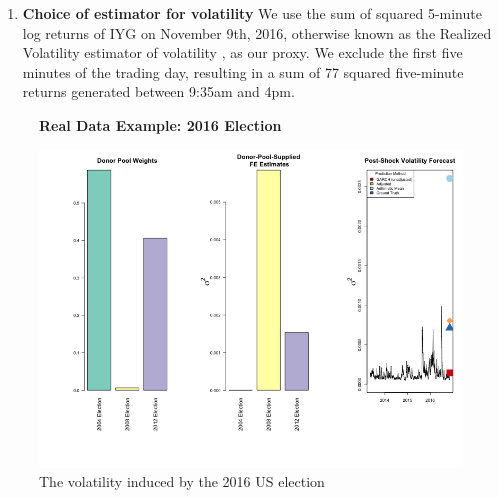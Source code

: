 \documentclass[11pt,3p,review,authoryear]{elsarticle}
\theoremstyle{definition}
\begin{document}
\begin{enumerate}
    \item \textbf{Choice of estimator for volatility} We use the sum of squared 5-minute log returns of IYG on November 9th, 2016, otherwise known as the Realized Volatility estimator of volatility \citep{andersen2008realized}, as our proxy.  We exclude the first five minutes of the trading day, resulting in a sum of 77 squared five-minute returns generated between 9:35am and 4pm.
\end{enumerate} 

\begin{figure}[H]
\begin{center}
  \textbf{Real Data Example: 2016 Election}\par\medskip
  \includegraphics[scale=.5]{real_data_output_plots/FriMay311830522024_IYG_None_2016-06-22.png}
  \caption{The volatility induced by the 2016 US election}
  \label{fig:SVF_2016}
  \end{center}
\end{figure}
\end{document}
